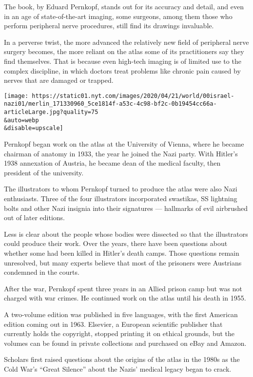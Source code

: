 The book, by Eduard Pernkopf, stands out for its accuracy and detail,
and even in an age of state-of-the-art imaging, some surgeons, among
them those who perform peripheral nerve procedures, still find its
drawings invaluable.

In a perverse twist, the more advanced the relatively new field of
peripheral nerve surgery becomes, the more reliant on the atlas some of
its practitioners say they find themselves. That is because even
high-tech imaging is of limited use to the complex discipline, in which
doctors treat problems like chronic pain caused by nerves that are
damaged or trapped.

\texttt{[image: https://static01.nyt.com/images/2020/04/21/world/00israel-nazi01/merlin\_171330960\_5ce1814f-a53c-4c98-bf2c-0b19454cc66a-articleLarge.jpg?quality=75\\\&auto=webp\\\&disable=upscale]}

Pernkopf began work on the atlas at the University of Vienna, where he
became chairman of anatomy in 1933, the year he joined the Nazi party.
With Hitler's 1938 annexation of Austria, he became dean of the medical
faculty, then president of the university.

The illustrators to whom Pernkopf turned to produce the atlas were also
Nazi enthusiasts. Three of the four illustrators incorporated swastikas,
SS lightning bolts and other Nazi insignia into their signatures ---
hallmarks of evil airbrushed out of later editions.

Less is clear about the people whose bodies were dissected so that the
illustrators could produce their work. Over the years, there have been
questions about whether some had been killed in Hitler's death camps.
Those questions remain unresolved, but many experts believe that most of
the prisoners were Austrians condemned in the courts.

After the war, Pernkopf spent three years in an Allied prison camp but
was not charged with war crimes. He continued work on the atlas until
his death in 1955.

A two-volume edition was published in five languages, with the first
American edition coming out in 1963. Elsevier, a European scientific
publisher that currently holds the copyright, stopped printing it on
ethical grounds, but the volumes can be found in private collections and
purchased on eBay and Amazon.

Scholars first raised questions about the origins of the atlas in the
1980s as the Cold War's ``Great Silence'' about the Nazis' medical
legacy began to crack.

